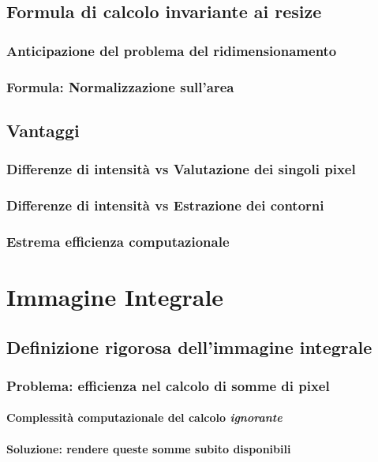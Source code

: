         \subsection{Formula di calcolo invariante ai resize}
            \subsubsection{Anticipazione del problema del ridimensionamento}
            \subsubsection{Formula: Normalizzazione sull'area}
        \subsection{Vantaggi}
            \subsubsection{Differenze di intensità vs Valutazione dei singoli pixel}
            \subsubsection{Differenze di intensità vs Estrazione dei contorni}
            \subsubsection{Estrema efficienza computazionale}
    \section{Immagine Integrale}
    \label{sec:integral_image}
        \subsection{Definizione rigorosa dell'immagine integrale}
            \subsubsection{Problema: efficienza nel calcolo di somme di pixel}
                \paragraph{Complessità computazionale del calcolo \emph{ignorante}}
                \paragraph{Soluzione: rendere queste somme subito disponibili}
